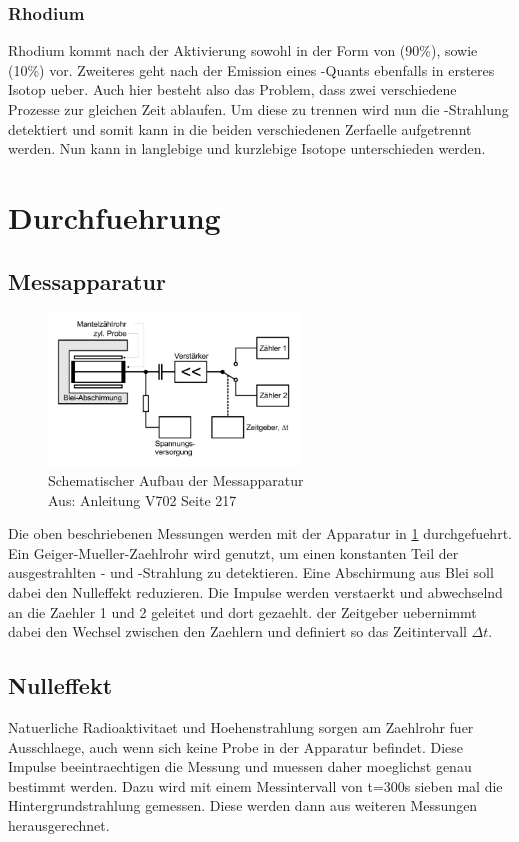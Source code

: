 \documentclass[titlepage=firstcover, captions=tableheading]{scrartcl}
\let\ce\ch
\begin{document}
\subsubsection{Rhodium}
Rhodium kommt nach der Aktivierung sowohl in der Form von \ce{^{104}Rh} (90\%), sowie \ce{^{104i}Rh} (10\%) vor. Zweiteres geht nach der Emission eines \gamma-Quants ebenfalls in ersteres Isotop ueber. Auch hier besteht also das Problem, dass zwei verschiedene Prozesse zur gleichen Zeit ablaufen. Um diese zu trennen wird nun die \gamma-Strahlung detektiert und somit kann in die beiden verschiedenen Zerfaelle aufgetrennt werden. Nun kann in langlebige und kurzlebige Isotope unterschieden werden.
\section{Durchfuehrung}
\subsection{Messapparatur}
\begin{figure}[H]
    \centering
    \includegraphics[width=0.6\textwidth]{"Apparatur_Aktivierung.png"}
    \caption{Schematischer Aufbau der Messapparatur\\Aus: Anleitung V702 Seite 217}
    \label{Fig:Apparatur}
\end{figure}
Die oben beschriebenen Messungen werden mit der Apparatur in \ref{Fig:Apparatur} durchgefuehrt. Ein Geiger-Mueller-Zaehlrohr wird genutzt, um einen konstanten Teil der ausgestrahlten \beta- und \gamma-Strahlung zu detektieren. Eine Abschirmung aus Blei soll dabei den Nulleffekt reduzieren. Die Impulse werden verstaerkt und abwechselnd an die Zaehler 1 und 2 geleitet und dort gezaehlt. der Zeitgeber uebernimmt dabei den Wechsel zwischen den Zaehlern und definiert so das Zeitintervall $\Delta t$.
\subsection{Nulleffekt}
Natuerliche Radioaktivitaet und Hoehenstrahlung sorgen am Zaehlrohr fuer Ausschlaege, auch wenn sich keine Probe in der Apparatur befindet. Diese Impulse beeintraechtigen die Messung und muessen daher moeglichst genau bestimmt werden. Dazu wird mit einem Messintervall von t=300s sieben mal die Hintergrundstrahlung gemessen. Diese werden dann aus weiteren Messungen herausgerechnet.
\end{document}
